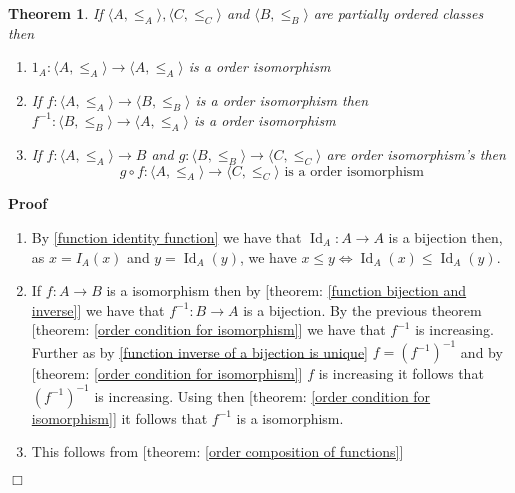 \documentclass{book}
\newcommand{\tmop}[1]{\ensuremath{\operatorname{#1}}}
\newenvironment{proof}{\noindent\textbf{Proof\ }}{\hspace*{\fill}$\Box$\medskip}
\newtheorem{theorem}{Theorem}
\begin{document}
\begin{theorem}
  \label{order isomorphism condition (2)}If $\langle A, \leqslant_A \rangle,
  \langle C, \leqslant_C \rangle$ and $\langle B, \leqslant_B \rangle$ are
  partially ordered classes then
  \begin{enumerate}
    \item $1_A : \langle A, \leqslant_A \rangle \rightarrow \langle A,
    \leqslant_A \rangle$ is a order isomorphism
    
    \item If $f : \langle A, \leqslant_A \rangle \rightarrow \langle B,
    \leqslant_B \rangle$ is a order isomorphism then $f^{- 1} : \langle B,
    \leqslant_B \rangle \rightarrow \langle A, \leqslant_A \rangle$ is a order
    isomorphism
    
    \item If $f : \langle A, \leqslant_A \rangle \rightarrow B$ and $g :
    \langle B, \leqslant_B \rangle \rightarrow \langle C, \leqslant_C \rangle$
    are order isomorphism's then
    \[ g \circ f : \langle A, \leqslant_A \rangle \rightarrow \langle C,
       \leqslant_C \rangle \text{ is a order isomorphism} \]
  \end{enumerate}
\end{theorem}

\begin{proof}
  
  \begin{enumerate}
    \item By \ref{function identity function} we have that $\tmop{Id}_A : A
    \rightarrow A$ is a bijection then, as $x = I_A (x)$ and $y = \tmop{Id}_A
    (y)$, we have $x \leqslant y \Leftrightarrow \tmop{Id}_A (x) \leqslant
    \tmop{Id}_A (y)$.
    
    \item If $f : A \rightarrow B$ is a isomorphism then by [theorem:
    \ref{function bijection and inverse}] we have that $f^{- 1} : B
    \rightarrow A$ is a bijection. By the previous theorem [theorem:
    \ref{order condition for isomorphism}] we have that $f^{- 1}$ is
    increasing. Further as by \ref{function inverse of a bijection is unique}
    $f = (f^{- 1})^{- 1}$ and by [theorem: \ref{order condition for
    isomorphism}] $f$ is increasing it follows that $(f^{- 1})^{- 1}$ is
    increasing. Using then [theorem: \ref{order condition for isomorphism}] it
    follows that $f^{- 1}$ is a isomorphism.
    
    \item This follows from [theorem: \ref{order composition of functions}]
  \end{enumerate}
\end{proof}
\end{document}

